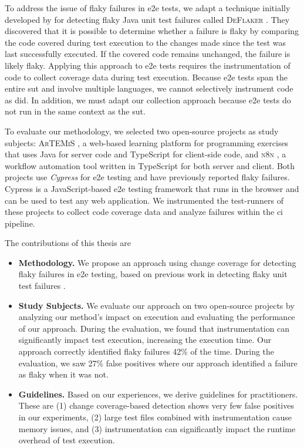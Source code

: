 To address the issue of flaky failures in \ac{e2e} tests, we adapt a technique initially developed by \citeauthor*{bell_deflaker_2018} for detecting flaky Java unit test failures called \textsc{DeFlaker} \autocite{bell_deflaker_2018}.
They discovered that it is possible to determine whether a failure is flaky by comparing the code covered during test execution to the changes made since the test was last successfully executed.
If the covered code remains unchanged, the failure is likely flaky.
Applying this approach to \ac{e2e} tests requires the instrumentation of code to collect coverage data during test execution.
Because \ac{e2e} tests span the entire \ac{sut} and involve multiple languages, we cannot selectively instrument code as \citeauthor*{bell_deflaker_2018} did.
In addition, we must adapt our collection approach because \ac{e2e} tests do not run in the same context as the \ac{sut}.

To evaluate our methodology, we selected two open-source projects as study subjects:
\textsc{ArTEMiS} \autocite{krusche_artemis_2018}, a web-based learning platform for programming exercises that uses Java for server code and TypeScript for client-side code, and \textsc{n8n} \autocite{noauthor_n8n_2023}, a workflow automation tool written in TypeScript for both server and client.
Both projects use \textit{Cypress} \autocite{noauthor_cypress-iocypress_2023} for \ac{e2e} testing and have previously reported flaky failures.
Cypress is a JavaScript-based \ac{e2e} testing framework that runs in the browser and can be used to test any web application.
We instrumented the test-runners of these projects to collect code coverage data and analyze failures within the \ac{ci} pipeline.

The contributions of this thesis are
\begin{itemize}
	\item \textbf{Methodology.} We propose an approach using change coverage for detecting flaky failures in \ac{e2e} testing, based on previous work in detecting flaky unit test failures \autocite{bell_deflaker_2018}.
	\item \textbf{Study Subjects.} We evaluate our approach on two open-source projects by analyzing our method's impact on execution and evaluating the performance of our approach.
	      During the evaluation, we found that instrumentation can significantly impact test execution, increasing the execution time.
	      Our approach correctly identified flaky failures 42\% of the time.
	      During the evaluation, we saw 27\% false positives where our approach identified a failure as flaky when it was not.
	\item \textbf{Guidelines.} Based on our experiences, we derive guidelines for practitioners. These are
	      (1) change coverage-based detection shows very few false positives in our experiments,
	      (2) large test files combined with instrumentation cause memory issues, and
	      (3) instrumentation can significantly impact the runtime overhead of test execution.
\end{itemize}

